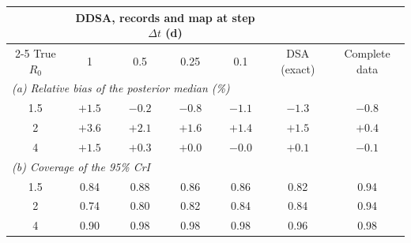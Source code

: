 \begin{tabular}{c cccc c c}
\toprule
& \multicolumn{4}{c}{DDSA, records and map at step $\Delta t$ (d)} & & \\
\cmidrule(lr){2-5}
True $R_0$ & 1 & 0.5 & 0.25 & 0.1 & DSA (exact) & Complete data \\
\midrule
\multicolumn{7}{l}{\textit{(a) Relative bias of the posterior median (\%)}} \\
1.5 & ${+}1.5$ & $-0.2$ & $-0.8$ & $-1.1$ & $-1.3$ & $-0.8$ \\
2 & ${+}3.6$ & ${+}2.1$ & ${+}1.6$ & ${+}1.4$ & ${+}1.5$ & ${+}0.4$ \\
4 & ${+}1.5$ & ${+}0.3$ & ${+}0.0$ & $-0.0$ & ${+}0.1$ & $-0.1$ \\
\midrule
\multicolumn{7}{l}{\textit{(b) Coverage of the 95\% CrI}} \\
1.5 & 0.84 & 0.88 & 0.86 & 0.86 & 0.82 & 0.94 \\
2 & 0.74 & 0.80 & 0.82 & 0.84 & 0.84 & 0.94 \\
4 & 0.90 & 0.98 & 0.98 & 0.98 & 0.96 & 0.98 \\
\bottomrule
\end{tabular}

